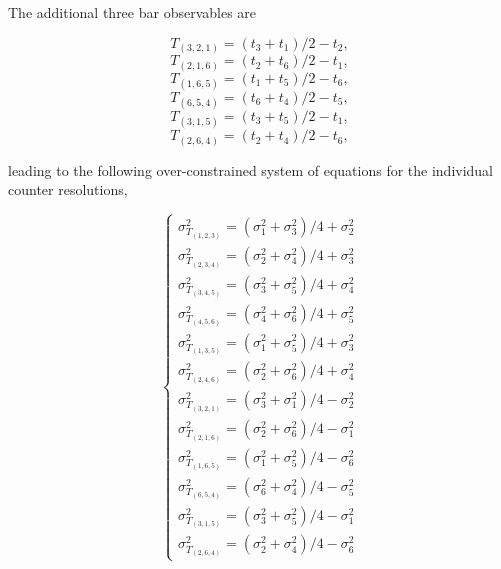 The additional three bar observables are

\begin{equation}
  T_{(3,2,1)} = (t_3 + t_1)/2 - t_2,
\end{equation}
\begin{equation}
  T_{(2,1,6)} = (t_2 + t_6)/2 - t_1,
\end{equation}
\begin{equation}
  T_{(1,6,5)} = (t_1 + t_5)/2 - t_6,
\end{equation}
\begin{equation}
  T_{(6,5,4)} = (t_6 + t_4)/2 - t_5,
\end{equation}
\begin{equation}
  T_{(3,1,5)} = (t_3 + t_5)/2 - t_1,
\end{equation}
\begin{equation}
  T_{(2,6,4)} = (t_2 + t_4)/2 - t_6,
\end{equation}

leading to the following over-constrained system of equations for the
individual counter resolutions,

\begin{equation}
  \begin{cases}
    \sigma_{T_{(1,2,3)}}^2 = (\sigma_1^2 + \sigma_3^2)/4 + \sigma_2^2\\
    \sigma_{T_{(2,3,4)}}^2 = (\sigma_2^2 + \sigma_4^2)/4 + \sigma_3^2\\
    \sigma_{T_{(3,4,5)}}^2 = (\sigma_3^2 + \sigma_5^2)/4 + \sigma_4^2\\
    \sigma_{T_{(4,5,6)}}^2 = (\sigma_4^2 + \sigma_6^2)/4 + \sigma_5^2\\
    \sigma_{T_{(1,3,5)}}^2 = (\sigma_1^2 + \sigma_5^2)/4 + \sigma_3^2\\
    \sigma_{T_{(2,4,6)}}^2 = (\sigma_2^2 + \sigma_6^2)/4 + \sigma_4^2\\
    \sigma_{T_{(3,2,1)}}^2 = (\sigma_3^2 + \sigma_1^2)/4 - \sigma_2^2\\
    \sigma_{T_{(2,1,6)}}^2 = (\sigma_2^2 + \sigma_6^2)/4 - \sigma_1^2\\
    \sigma_{T_{(1,6,5)}}^2 = (\sigma_1^2 + \sigma_5^2)/4 - \sigma_6^2\\
    \sigma_{T_{(6,5,4)}}^2 = (\sigma_6^2 + \sigma_4^2)/4 - \sigma_5^2\\
    \sigma_{T_{(3,1,5)}}^2 = (\sigma_3^2 + \sigma_5^2)/4 - \sigma_1^2\\
    \sigma_{T_{(2,6,4)}}^2 = (\sigma_2^2 + \sigma_4^2)/4 - \sigma_6^2
  \end{cases}
\end{equation}

